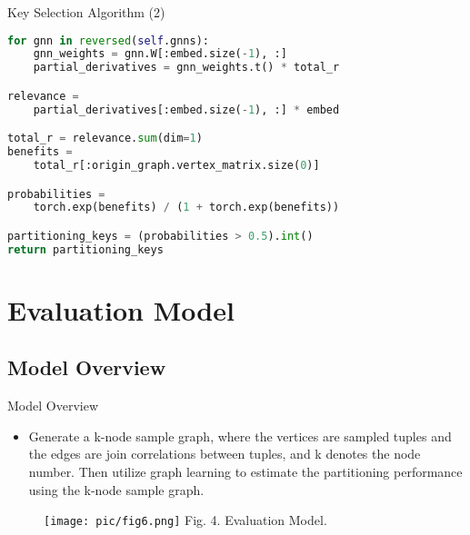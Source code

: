 \documentclass{beamer}
\begin{document}
\begin{frame}[fragile]{Key Selection Algorithm (2)}
    \begin{minipage}{1.045\linewidth}
\begin{lstlisting}[language=python]
for gnn in reversed(self.gnns):
    gnn_weights = gnn.W[:embed.size(-1), :]
    partial_derivatives = gnn_weights.t() * total_r

relevance =
    partial_derivatives[:embed.size(-1), :] * embed

total_r = relevance.sum(dim=1)
benefits =
    total_r[:origin_graph.vertex_matrix.size(0)]

probabilities =
    torch.exp(benefits) / (1 + torch.exp(benefits))

partitioning_keys = (probabilities > 0.5).int()
return partitioning_keys
\end{lstlisting}
    \end{minipage}
\end{frame}

\section{Evaluation Model}
\subsection{Model Overview}
\begin{frame}{Model Overview}
    \begin{itemize}
        \item Generate a k-node sample graph, where the vertices are sampled tuples and the edges are join correlations between tuples, and k denotes the node number. Then utilize graph learning to estimate the partitioning performance using the k-node sample graph.
    \end{itemize}
    \vspace{0.35cm}
    \begin{minipage}{1.0\linewidth}
        \begin{figure}[htpb]
            \centering
            \texttt{[image: pic/fig6.png]}
            \tiny{Fig. 4. Evaluation Model.}
        \end{figure}
    \end{minipage}
\end{frame}
\end{document}
